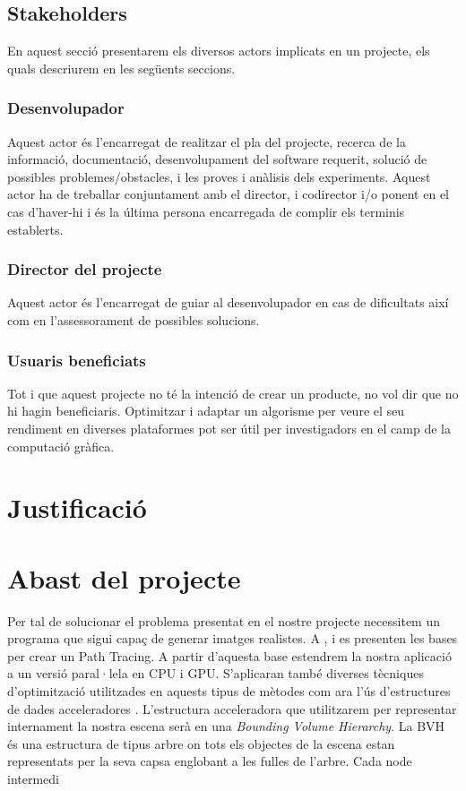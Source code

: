 \documentclass[a4paper,titlepage]{article}
\begin{document}
\subsection{Stakeholders}

En aquest secció presentarem els diversos actors implicats en un projecte, els quals descriurem en les següents seccions.

\subsubsection{Desenvolupador}

Aquest actor és l'encarregat de realitzar el pla del projecte, recerca de la informació, documentació, desenvolupament del software requerit, solució de possibles problemes/obstacles, i les proves i anàlisis dels experiments. Aquest actor ha de treballar conjuntament amb el director, i codirector i/o ponent en el cas d'haver-hi i és la última persona encarregada de complir els terminis establerts. 

\subsubsection{Director del projecte}

Aquest actor és l'encarregat de guiar al desenvolupador en cas de dificultats així com en l'assessorament de possibles solucions.

\subsubsection{Usuaris beneficiats}

Tot i que aquest projecte no té la intenció de crear un producte, no vol dir que no hi hagin beneficiaris. Optimitzar i adaptar un algorisme per veure el seu rendiment en diverses plataformes pot ser útil per investigadors en el camp de la computació gràfica.

\section{Justificació}

\section{Abast del projecte}

Per tal de solucionar el problema presentat en el nostre projecte necessitem un programa que sigui capaç de generar imatges realistes. A \cite{Shirley2018a}, \cite{Shirley2018b} i \cite{Shirley2018c} es presenten les bases per crear un Path Tracing. A partir d'aquesta base estendrem la nostra aplicació a un versió paral·lela en CPU i GPU. S'aplicaran també diverses tècniques d'optimització utilitzades en aquests tipus de mètodes com ara l'ús d'estructures de dades acceleradores \cite{Hunt2008}. L'estructura acceleradora que utilitzarem per representar internament la nostra escena serà en una \textit{Bounding Volume Hierarchy}. La BVH és una estructura de tipus arbre on tots els objectes de la escena estan representats per la seva capsa englobant a les fulles de l'arbre. Cada node intermedi  
\end{document}

